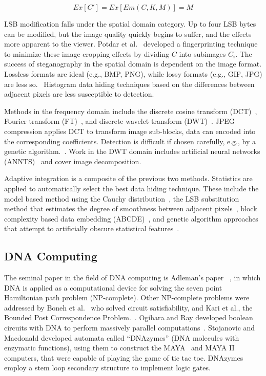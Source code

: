 \documentclass{bioinfo}
\begin{document}
\[
	Ex[C'] = Ex[Em(C,K,M)] = M
\]

LSB modification falls under the spatial domain category. Up to four LSB bytes can be modified, but the image quality quickly begins to suffer, and the effects more apparent to the viewer. Potdar et al.~\cite{POTDAR2005} developed a fingerprinting technique to minimize these image cropping effects by dividing $C$ into subimages $C_i$. The success of steganography in the spatial domain is dependent on the image format. Lossless formats are ideal (e.g., BMP, PNG), while lossy formats (e.g., GIF, JPG) are less so.~\cite{JUNG2009} Histogram data hiding techniques based on the differences between adjacent pixels are less susceptible to detection.~\cite{LI2009}

Methods in the frequency domain include the discrete cosine transform (DCT)~\cite{MANIKOPOLOUS2002}, Fourier transform (FT)~\cite{MCKEON2007}, and discrete wavelet transform (DWT)~\cite{CHEN2007,POTDAR2005S,VERMA2005,ABDULAZIZ2000}. JPEG compression applies DCT to transform image sub-blocks, data can encoded into the corresponding coefficients. Detection is difficult if chosen carefully, e.g., by a genetic algorithm.~\cite{FARD2006}. Work in the DWT domain includes artificial neural networks (ANNTS)~\cite{PAULSON2006} and cover image decomposition.~\cite{ABDELWAHAB2008}

Adaptive integration is a composite of the previous two methods. Statistics are applied to automatically select the best data hiding technique. These include the model based method using the Cauchy distribution~\cite{SALLEE2003}, the LSB substitution method that estimates the degree of smoothness between adjacent pixels~\cite{CHANG2004}, block complexity based data embedding (ABCDE)~\cite{HIROHISA2002}, and genetic algorithm approaches that attempt to artificially obscure statistical features~\cite{WU2006GEN}.

\subsection{DNA Computing}

The seminal paper in the field of DNA computing is Adleman's paper ~\cite{ADLEMAN1994}, in which DNA is applied as a computational device for solving the seven point Hamiltonian path problem (NP-complete). Other NP-complete problems were addressed by Boneh et al.~\cite{BONEH1996} who  solved circuit satisfiability, and Kari et al., the Bounded Post Correspondence Problem.~\cite{KARI2000}. Ogihara and Ray developed boolean circuits with DNA to perform massively parallel computations~\cite{OGIHARA1999}. Stojanovic and Macdonald developed automata called ``DNAzymes'' (DNA molecules with enzymatic functions), using them to construct the MAYA~\cite{STOJANOVIC2003} and MAYA II~\cite{MACDONALD2006} computers, that were capable of playing the game of tic tac toe. DNAzymes employ a stem loop secondary structure to implement logic gates.
\end{document}
